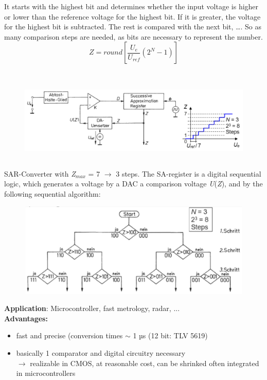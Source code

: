 It starts with the highest bit and determines whether the input voltage is higher or lower than the reference voltage for the highest bit. If it is greater, the voltage for the highest bit is subtracted. The rest is compared with the next bit, {\dots}. So as many comparison steps are needed, as bits are necessary to represent the number.\\

\[Z=round\left[\frac{U_{e} }{U_{ref} } \left(2^{N} -1\right)\right]\] \\
    \begin{figure}[h]
    \centering
    \includegraphics[width=13cm, height=4cm]{Images/image176.png}
    \label{fig:Fig }
    \end{figure}

SAR-Converter with \textit{Z${}_{max}$} = 7 $\rightarrow$  3 steps. The SA-register is a digital sequential logic, which generates a voltage by a DAC a comparison voltage \textit{U}(\textit{Z}), and by the following sequential algorithm:

    \begin{figure}[h]
    \centering
    \includegraphics[width=12cm, height=4.5cm]{Images/image177.png}
    \label{fig:Fig }
    \end{figure}

\textbf{Application}: Microcontroller, fast metrology, radar, ...\\

\textbf{Advantages: }

\begin{itemize}
\item fast and precise (conversion times $\mathrm{\sim}$ 1 µs (12 bit: TLV 5619)
\item  basically 1 comparator and digital circuitry necessary  \\
$\rightarrow$ realizable in CMOS, at reasonable cost, can be shrinked often integrated in microcontrollers
\end{itemize}

